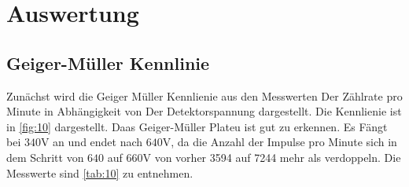 \section{Auswertung}
\label{sec:Auswertung}
\subsection{Geiger-Müller Kennlinie}
Zunächst wird die Geiger Müller Kennlienie aus den Messwerten 
Der Zählrate pro Minute in Abhängigkeit von Der Detektorspannung
dargestellt. Die Kennlienie ist in \autoref{fig:10} dargestellt. 
Daas Geiger-Müller Plateu ist gut zu erkennen. Es Fängt bei 
$340\unit{\volt}$ an und endet nach $640\unit{\volt}$, da die Anzahl 
der Impulse pro Minute sich in dem Schritt von $640$ auf $660\unit{\volt}$
von vorher 3594 auf 7244 mehr als verdoppeln. Die Messwerte sind 
\autoref{tab:10} zu entnehmen. 


